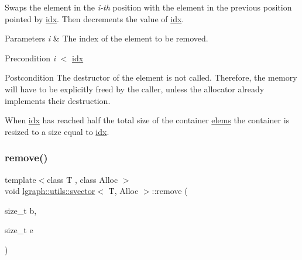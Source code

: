 Swaps the element in the {\itshape i-\/th} position with the element in the previous position pointed by \hyperlink{classlgraph_1_1utils_1_1svector_a7ef963c079c7dc8a6a559ceef81a241f}{idx}. Then decrements the value of \hyperlink{classlgraph_1_1utils_1_1svector_a7ef963c079c7dc8a6a559ceef81a241f}{idx}.


\begin{DoxyParams}{Parameters}
{\em i} & The index of the element to be removed. \\
\hline
\end{DoxyParams}
\begin{DoxyPrecond}{Precondition}
{\itshape i} $<$ \hyperlink{classlgraph_1_1utils_1_1svector_a7ef963c079c7dc8a6a559ceef81a241f}{idx} 
\end{DoxyPrecond}
\begin{DoxyPostcond}{Postcondition}
The destructor of the element is not called. Therefore, the memory will have to be explicitly freed by the caller, unless the allocator already implements their destruction.
\end{DoxyPostcond}
When \hyperlink{classlgraph_1_1utils_1_1svector_a7ef963c079c7dc8a6a559ceef81a241f}{idx} has reached half the total size of the container \hyperlink{classlgraph_1_1utils_1_1svector_aa72e9ffeb58f88d3cb01671e3e672a45}{elems} the container is resized to a size equal to \hyperlink{classlgraph_1_1utils_1_1svector_a7ef963c079c7dc8a6a559ceef81a241f}{idx}. \mbox{\label{classlgraph_1_1utils_1_1svector_a1df0b9cabdb2e9f572f664d85ba42efb}} 
\subsubsection{\texorpdfstring{remove()}{remove()}\hspace{0.1cm}{\footnotesize\ttfamily [2/2]}}
{\footnotesize\ttfamily template$<$class T , class Alloc $>$ \\
void \hyperlink{classlgraph_1_1utils_1_1svector}{lgraph\+::utils\+::svector}$<$ T, Alloc $>$\+::remove (\begin{DoxyParamCaption}\item[{size\+\_\+t}]{b,  }\item[{size\+\_\+t}]{e }\end{DoxyParamCaption})}



